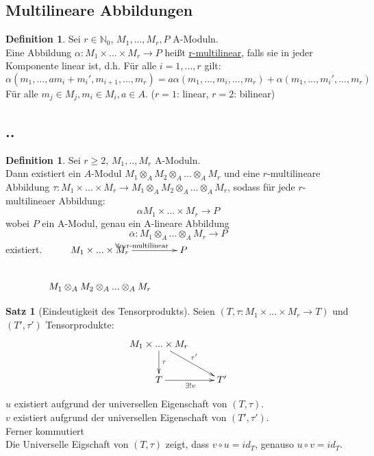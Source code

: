 \documentclass[10pt,a4paper]{article}
\newcommand{\N}{\ensuremath{\mathbb{N}}}
\newcommand{\al}{\ensuremath{\alpha}}
\newcommand{\ol}[1]{\overline{#1}}
\newcounter{thm}[section]
\theoremstyle{definition}
\newtheorem{definition}[thm]{Definition}
\newtheorem{satz}[thm]{Satz}
\theoremstyle{plain}
\theoremstyle{remark}
\begin{document}
\subsection{Multilineare Abbildungen}
\begin{definition}
	Sei $r\in \N_0$, $M_1,...,M_r,P$ A-Moduln.\\
	Eine Abbildung $\al:M_1\times...\times M_r\rightarrow P$ heißt \underline{r-multilinear}, falls sie in jeder Komponente linear ist, d.h. Für alle $i=1,...,r$ gilt:
	\[\al(m_1,...,am_{i}+m_i',m_{i+1},...,m_r)=a\al(m_1,...,m_i,...,m_r)+\al(m_1,...,m_i',...,m_r)\]
	Für alle $m_j\in M_j,m_i\in M_i,a\in A$.
	($r=1$: linear, $r=2$: bilinear)
\end{definition}
\subsection{..}
\begin{definition}
	Sei $r\ge 2$, $M_1,..,M_r$ A-Moduln.\\
	Dann existiert ein $A$-Modul $M_1\otimes_AM_2\otimes_A...\otimes_AM_r$ und eine $r$-multilineare Abbildung $\tau:M_1\times...\times M_r\rightarrow M_1\otimes_AM_2\otimes_A...\otimes_AM_r$, sodass für jede $r$-multilineaer Abbildung:
	\[\al M_1\times...\times M_r\rightarrow P\]
	wobei $P$ ein A-Modul, genau ein A-lineare Abbildung 
	\[\ol\al:M_1\otimes_A...\otimes_AM_r\rightarrow P\]
	existiert.
	$\xymatrix{
		M_1\times...\times M_r \ar[r]^{\forall\al: \text{r-multilinear}} & P\\
		M_1\otimes_AM_2\otimes_A...\otimes_AM_r&
	}$
\end{definition}
\begin{satz}[Eindeutigkeit des Tensorprodukts]
	Seien $(T,\tau:M_1\times...\times M_r\rightarrow T)$ und $(T',\tau')$ Tensorprodukte:
	\[\xymatrix{ 
		M_1\times...\times M_r \ar[d]^{\tau} \ar[dr]^{\tau'}&\\
		T\ar[r]_{\exists!v}&T'
	}\]
	$u$ existiert aufgrund der universellen Eigenschaft von $(T,\tau)$.\\
	$v$ existiert aufgrund der universellen Eigenschaft von $(T',\tau')$.\\
	Ferner kommutiert\\
	
	Die Universelle Eigschaft von $(T,\tau)$ zeigt, dass $v\circ u=id_T$, genauso $u\circ v=id_T$.
\end{satz}
\end{document}
